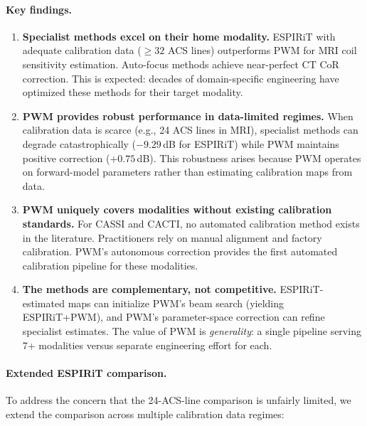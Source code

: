 \documentclass[11pt]{article}
\begin{document}
\paragraph{Key findings.}
\begin{enumerate}
  \item \textbf{Specialist methods excel on their home modality.} ESPIRiT with adequate calibration data ($\geq 32$ ACS lines) outperforms PWM for MRI coil sensitivity estimation. Auto-focus methods achieve near-perfect CT CoR correction. This is expected: decades of domain-specific engineering have optimized these methods for their target modality.

  \item \textbf{PWM provides robust performance in data-limited regimes.} When calibration data is scarce (e.g., 24 ACS lines in MRI), specialist methods can degrade catastrophically ($-9.29$\,dB for ESPIRiT) while PWM maintains positive correction ($+0.75$\,dB). This robustness arises because PWM operates on forward-model parameters rather than estimating calibration maps from data.

  \item \textbf{PWM uniquely covers modalities without existing calibration standards.} For CASSI and CACTI, no automated calibration method exists in the literature. Practitioners rely on manual alignment and factory calibration. PWM's autonomous correction provides the first automated calibration pipeline for these modalities.

  \item \textbf{The methods are complementary, not competitive.} ESPIRiT-estimated maps can initialize PWM's beam search (yielding ESPIRiT+PWM), and PWM's parameter-space correction can refine specialist estimates. The value of PWM is \emph{generality}: a single pipeline serving 7+ modalities versus separate engineering effort for each.
\end{enumerate}

\paragraph{Extended ESPIRiT comparison.}
To address the concern that the 24-ACS-line comparison is unfairly limited, we extend the comparison across multiple calibration data regimes:
\end{document}
